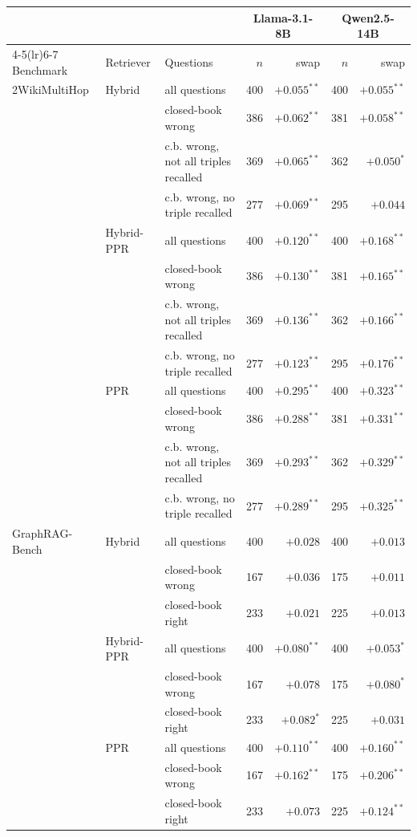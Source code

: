 \begin{tabular}{lllrrrr}
\toprule
 & & & \multicolumn{2}{c}{Llama-3.1-8B} & \multicolumn{2}{c}{Qwen2.5-14B}\\
\cmidrule(lr){4-5}\cmidrule(lr){6-7}
Benchmark & Retriever & Questions & $n$ & swap & $n$ & swap\\
\midrule
2WikiMultiHop & Hybrid & all questions & 400 & $+0.055^{**}$ & 400 & $+0.055^{**}$\\
 &  & closed-book wrong & 386 & $+0.062^{**}$ & 381 & $+0.058^{**}$\\
 &  & c.b. wrong, not all triples recalled & 369 & $+0.065^{**}$ & 362 & $+0.050^{*}$\\
 &  & c.b. wrong, no triple recalled & 277 & $+0.069^{**}$ & 295 & $+0.044$\\
 & Hybrid-PPR & all questions & 400 & $+0.120^{**}$ & 400 & $+0.168^{**}$\\
 &  & closed-book wrong & 386 & $+0.130^{**}$ & 381 & $+0.165^{**}$\\
 &  & c.b. wrong, not all triples recalled & 369 & $+0.136^{**}$ & 362 & $+0.166^{**}$\\
 &  & c.b. wrong, no triple recalled & 277 & $+0.123^{**}$ & 295 & $+0.176^{**}$\\
 & PPR & all questions & 400 & $+0.295^{**}$ & 400 & $+0.323^{**}$\\
 &  & closed-book wrong & 386 & $+0.288^{**}$ & 381 & $+0.331^{**}$\\
 &  & c.b. wrong, not all triples recalled & 369 & $+0.293^{**}$ & 362 & $+0.329^{**}$\\
 &  & c.b. wrong, no triple recalled & 277 & $+0.289^{**}$ & 295 & $+0.325^{**}$\\
\midrule
GraphRAG-Bench & Hybrid & all questions & 400 & $+0.028$ & 400 & $+0.013$\\
 &  & closed-book wrong & 167 & $+0.036$ & 175 & $+0.011$\\
 &  & closed-book right & 233 & $+0.021$ & 225 & $+0.013$\\
 & Hybrid-PPR & all questions & 400 & $+0.080^{**}$ & 400 & $+0.053^{*}$\\
 &  & closed-book wrong & 167 & $+0.078$ & 175 & $+0.080^{*}$\\
 &  & closed-book right & 233 & $+0.082^{*}$ & 225 & $+0.031$\\
 & PPR & all questions & 400 & $+0.110^{**}$ & 400 & $+0.160^{**}$\\
 &  & closed-book wrong & 167 & $+0.162^{**}$ & 175 & $+0.206^{**}$\\
 &  & closed-book right & 233 & $+0.073$ & 225 & $+0.124^{**}$\\
\bottomrule
\end{tabular}
